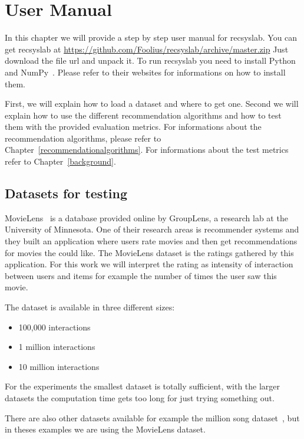 \chapter{User Manual}
\label{usermanual}
In this chapter we will provide a step by step user manual for recsyslab.
You can get recsyslab at \url{https://github.com/Foolius/recsyslab/archive/master.zip}
Just download the file url and unpack it.
To run recsyslab you need to install Python~\cite{python} and NumPy~\cite{numpy}.
Please refer to their websites for informations on how to install them.

First, we will explain how to load a dataset and where to get one. Second we
will explain how to use the different recommendation algorithms and
how to test them with the provided evaluation metrics. 
For informations about the recommendation algorithms, please refer to Chapter~\ref{recommendationalgorithms}.
For informations about the test metrics refer to Chapter~\ref{background}.

\section{Datasets for testing}
\label{movielens}

MovieLens~\cite{movielensdatasets} is a database provided online by GroupLens, a research
lab at the University of Minnesota. One of their research areas is
recommender systems and they built an application where users rate
movies and then get recommendations for movies the could like. The
MovieLens dataset is the ratings gathered by this application. For
this work we will interpret the rating as intensity of interaction
between users and items for example the number of times the user saw
this movie.

The dataset is available in three different sizes:
\begin{itemize}
\item 100,000 interactions
\item 1 million interactions
\item 10 million interactions
\end{itemize}
For the experiments the smallest dataset is totally sufficient, with
the larger datasets the computation time gets too long for just trying
something out.

There are also other datasets available for example the 
million song dataset~\cite{Bertin-Mahieux2011}, but in theses examples we are using the 
MovieLens dataset.

